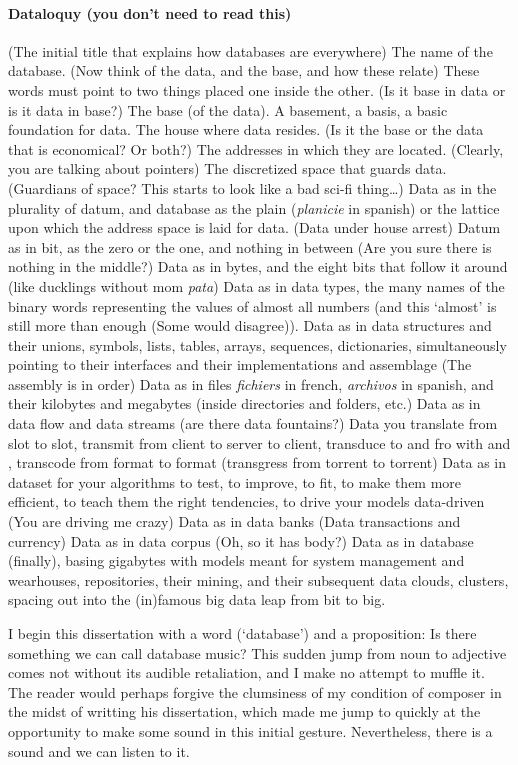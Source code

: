 \paragraph{Dataloquy (you don't need to read this)}
(The initial title that explains how databases are everywhere) The name of the database. (Now think of the data, and the base, and how these relate) These words must point to two things placed one inside the other. (Is it base in data or is it data in base?) The base (of the data). A basement, a basis, a basic foundation for data. The house where data resides. (Is it the base or the data that is economical? Or both?) The addresses in which they are located. (Clearly, you are talking about pointers) The discretized space that guards data. (Guardians of space? This starts to look like a bad sci-fi thing\dots) Data as in the plurality of datum, and database as the plain (\textit{planicie} in spanish) or the lattice upon which the address space is laid for data. (Data under house arrest) Datum as in bit, as the zero or the one, and nothing in between (Are you sure there is nothing in the middle?) Data as in bytes, and the eight bits that follow it around (like ducklings without mom \textit{pata}) Data as in data types, the many names of the binary words representing the values of almost all numbers (and this `almost' is still more than enough (Some would disagree)). Data as in data structures and their unions, symbols, lists, tables, arrays, sequences, dictionaries, simultaneously pointing to their interfaces and their implementations and assemblage (The assembly is in order) Data as in files \textit{fichiers} in french, \textit{archivos} in spanish, and their kilobytes and megabytes (inside directories and folders, etc.) Data as in data flow and data streams (are there data fountains?) Data you translate from slot to slot, transmit from client to server to client, transduce to and fro with  and , transcode from format to format (transgress from torrent to torrent) Data as in dataset for your algorithms to test, to improve, to fit, to make them more efficient, to teach them the right tendencies, to drive your models data-driven (You are driving me crazy) Data as in data banks (Data transactions and currency) Data as in data corpus (Oh, so it has body?) Data as in database (finally), basing gigabytes with models meant for system management and wearhouses, repositories, their mining, and their subsequent data clouds, clusters, spacing out into the (in)famous big data leap from bit to big.

I begin this dissertation with a word (`database') and a proposition: Is there something we can call database music? This sudden jump from noun to adjective comes not without its audible retaliation, and I make no attempt to muffle it. The reader would perhaps forgive the clumsiness of my condition of composer in the midst of writting his dissertation, which made me jump to quickly at the opportunity to make some sound in this initial gesture. Nevertheless, there is a sound and we can listen to it.


